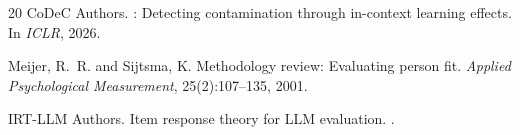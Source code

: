 \documentclass[11pt,a4paper]{article}
\begin{document}
\begin{thebibliography}{20}
{CoDeC Authors}.
: Detecting contamination through in-context learning effects.
\newblock In \emph{ICLR}, 2026.

Meijer, R.~R. and Sijtsma, K.
\newblock Methodology review: Evaluating person fit.
\newblock \emph{Applied Psychological Measurement}, 25(2):107--135, 2001.

{IRT-LLM Authors}.
\newblock Item response theory for {LLM} evaluation.
.

\end{thebibliography}
\end{document}
